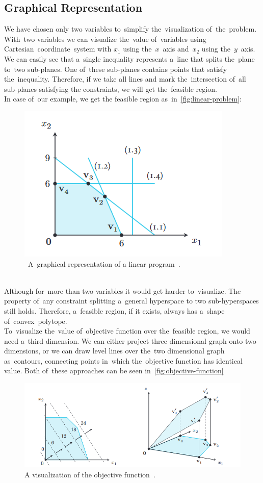 \subsection{Graphical Representation}
We have chosen only two variables to~simplify the~visualization of~the~problem. With~two variables we can visualize the~value of~variables using Cartesian~coordinate~system with $x_1$ using the~$x$~axis and~$x_2$ using the~$y$~axis. \\
We can easily see that a~single inequality represents a~line that splits the~plane to~two sub-planes. One of~these sub-planes contains points that satisfy the~inequality. Therefore, if we take all lines and mark the~intersection of~all sub-planes satisfying the constraints, we will get the~feasible region. \\
In case of~our example, we get the feasible region as~in~\autoref{fig:linear-problem}:
\begin{figure}[h]
    \centering
    \includegraphics[width=0.5\linewidth]{linear_program.png}
    \caption[A~graphical representation of a linear program]{~A~graphical representation of a linear program~\cite{Sierksma}.}
    \label{fig:linear-problem}
\end{figure}
\\
Although for~more than two variables it would get harder to~visualize. The property of~any constraint splitting a~general hyperspace to two sub-hyperspaces still holds. Therefore, a~feasible region, if it exists, always has a~shape of~convex~polytope.\\
To~visualize the~value of~objective function over the~feasible region, we would need a~third dimension. We can either project three dimensional graph onto two dimensions, or we can draw level lines over the~two dimensional graph as~contours, connecting points in~which the~objective function has identical value. Both of~these approaches can be seen in~\autoref{fig:objective-function}
\begin{figure}[h!]
    \centering
    \includegraphics[width=1.0\linewidth]{objective-function.png}
    \caption[A visualization of the objective function]{A visualization of the objective function~\cite{Sierksma}.}
    \label{fig:objective-function}
\end{figure} \\
